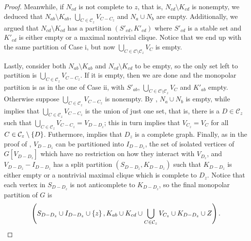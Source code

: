 \begin{proof}
    Meanwhile, if $N_{cd}$ is not complete to $z$, that is, $N_{cd}\setminus
    K_{cd}$ is nonempty, we deduced that $N_{ab}\setminus K_{ab}$,
    $\bigcup_{C\in\mathcal{C}_z} V_{C-C_z}$ and $N_a \cup N_b$ are empty.
    Additionally, we argued that $N_{cd}\setminus K_{cd}$ has a partition
    $(S'_{cd},K'_{cd})$ where $S'_{cd}$ is a stable set and $K'_{cd}$ is either
    empty or a maximal nontrivial clique. Notice that we end up with the same
    partition of Case i, but now $\bigcup_{C\in\mathcal{C} \setminus
    \mathcal{C}_z} V_C$ is empty.

    Lastly, consider both $N_{ab}\setminus K_{ab}$ and $N_{cd}\setminus K_{cd}$
    to be empty, so the only set left to partition is
    $\bigcup_{C\in\mathcal{C}_z} V_{C-C_z}$. If it is empty, then we are done
    and the monopolar partition is as in the one of Case ii, with $S'_{ab}$,
    $\bigcup_{C\in\mathcal{C} \setminus \mathcal{C}_z} V_C$ and $K'_{ab}$ empty.
    Otherwise suppose $\bigcup_{C\in\mathcal{C}_z} V_{C-C_z}$ is nonempty. By
    , $N_a\cup N_b$ is empty, while
     implies that $\bigcup_{C\in\mathcal{C}_z} V_{C-C_z}$
    is the union of just one set, that is, there is a $D\in \mathcal{C}_z$ such
    that $\bigcup_{C\in\mathcal{C}_z} V_{C-C_z} = V_{D-D_z}$; this in turn
    implies that $V_{C_z}=V_C$ for all $C\in \mathcal{C}_z\setminus \left\{D\right\}$.
    Futhermore,  implies that $D_z$ is a complete graph.
    Finally, as in the proof of , $V_{D-D_z}$ can be
    partitioned into $I_{D-D_z}$, the set of isolated vertices of $G[V_{D-D_z}]$
    which have no restriction on how they interact with $V_{D_z}$, and
    $V_{D-D_z}-I_{D-D_z}$ has a split partition $(S_{D-D_z},K_{D-D_z})$ such
    that $K_{D-D_z}$ is either empty or a nontrivial maximal clique which is
    complete to $D_z$. Notice that each vertex in $S_{D-D_z}$ is not
    anticomplete to $K_{D-D_z}$, so the final monopolar partition of $G$ is
    \[
        \left(S_{D-D_z} \cup I_{D-D_z} \cup \left\{z\right\}, K_{ab} \cup K_{cd} \cup 
        \bigcup_{C\in \mathcal{C}_z} V_{C_z} \cup K_{D-D_z} \cup Z\right).
    \]


\end{proof}
